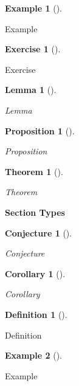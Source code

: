 \documentclass[
  12pt,
  a4paper,
  oneside,
  titlepage,
  toclink=all,
  toc=bibliography]{scrbook}
\theoremstyle{definition}
\newtheorem{definition}{Definition}[section]
\theoremstyle{plain}
\newtheorem{corollary}{Corollary}[section]
\theoremstyle{plain}
\newtheorem{conjecture}{Conjecture}[section]
\theoremstyle{plain}
\newtheorem{theorem}{Theorem}[section]
\theoremstyle{plain}
\newtheorem{proposition}{Proposition}[section]
\theoremstyle{definition}
\newtheorem{exercise}{Exercise}[section]
\theoremstyle{definition}
\newtheorem{example}{Example}[section]
\theoremstyle{plain}
\newtheorem{lemma}{Lemma}[section]
\theoremstyle{remark}
\begin{document}
\begin{example}[]\protect\hypertarget{exm-scriv4}{}\label{exm-scriv4}

Example

\end{example}

\begin{exercise}[]\protect\hypertarget{exr-scriv4}{}\label{exr-scriv4}

Exercise

\end{exercise}

\begin{lemma}[]\protect\hypertarget{lem-scriv4}{}\label{lem-scriv4}

Lemma

\end{lemma}

\begin{proposition}[]\protect\hypertarget{prp-scriv4}{}\label{prp-scriv4}

Proposition

\end{proposition}

\begin{theorem}[]\protect\hypertarget{thm-scriv4}{}\label{thm-scriv4}

Theorem

\end{theorem}

\textbf{Section Types}

\begin{conjecture}[]\protect\hypertarget{cnj-scriv5}{}\label{cnj-scriv5}

Conjecture

\end{conjecture}

\begin{corollary}[]\protect\hypertarget{cor-scriv6}{}\label{cor-scriv6}

Corollary

\end{corollary}

\begin{definition}[]\protect\hypertarget{def-scriv7}{}\label{def-scriv7}

Definition

\end{definition}

\begin{example}[]\protect\hypertarget{exm-scriv8}{}\label{exm-scriv8}

Example

\end{example}
\end{document}
